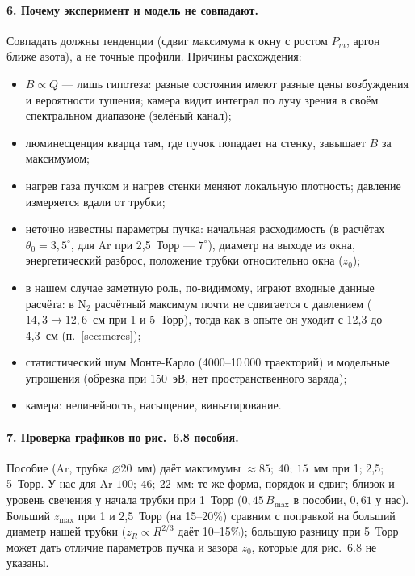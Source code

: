 \documentclass[12pt,a4paper]{article}
\newcommand{\Nt}{\mathrm{N_2}}
\begin{document}
\paragraph{6. Почему эксперимент и модель не совпадают.}
Совпадать должны тенденции (сдвиг максимума к окну с ростом $P_m$,
аргон ближе азота), а не точные профили. Причины расхождения:
\begin{itemize}
  \item $B \propto Q$ --- лишь гипотеза: разные состояния имеют разные
        цены возбуждения и вероятности тушения; камера видит интеграл
        по лучу зрения в своём спектральном диапазоне (зелёный канал);
  \item люминесценция кварца там, где пучок попадает на стенку, завышает
        $B$ за максимумом;
  \item нагрев газа пучком и нагрев стенки меняют локальную плотность;
        давление измеряется вдали от трубки;
  \item неточно известны параметры пучка: начальная расходимость
        (в расчётах $\theta_0 = 3{,}5^\circ$, для Ar при 2,5~Торр ---
        $7^\circ$), диаметр на выходе из окна, энергетический
        разброс, положение трубки относительно окна ($z_0$);
  \item в нашем случае заметную роль, по-видимому, играют входные данные
        расчёта: в $\Nt$ расчётный максимум почти не сдвигается с
        давлением ($14{,}3\to12{,}6$~см при 1 и 5~Торр), тогда как в опыте
        он уходит с 12,3 до 4,3~см (п.~\ref{sec:mcres});
  \item статистический шум Монте-Карло (4000--10\,000 траекторий) и
        модельные упрощения (обрезка при 150~эВ, нет пространственного
        заряда);
  \item камера: нелинейность, насыщение, виньетирование.
\end{itemize}

\paragraph{7. Проверка графиков по рис.~6.8 пособия.}
Пособие (Ar, трубка $\varnothing 20$~мм) даёт максимумы
$\approx 85;\ 40;\ 15$~мм при 1; 2,5; 5~Торр. У нас для Ar
$100;\ 46;\ 22$~мм: те же форма, порядок и сдвиг; близок и уровень
свечения у начала трубки при 1~Торр ($0{,}45\,B_\text{max}$ в пособии,
$0{,}61$ у нас). Больший $z_\text{max}$ при 1 и 2,5~Торр (на 15--20\%)
сравним с поправкой на больший диаметр нашей трубки
($z_R\propto R^{2/3}$ даёт 10--15\%); большую разницу при 5~Торр может
дать отличие параметров пучка и зазора $z_0$, которые для рис.~6.8 не
указаны.
\end{document}
